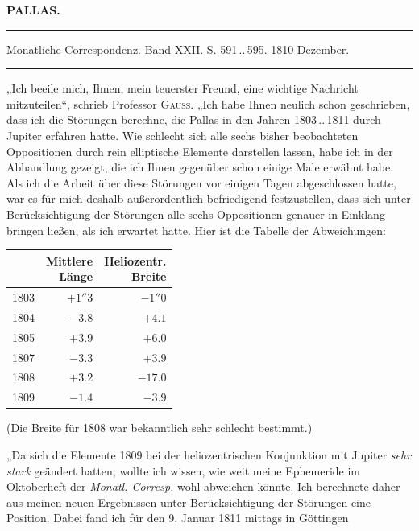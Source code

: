 \clearpage{}\hypertarget{native-325-lower}{}\label{native-325-lower}
\begin{center}\textbf{PALLAS.}\par\vspace{4pt}\hrule\vspace{4pt}\fontsize{10}{12}\selectfont Monatliche Correspondenz. Band XXII. S. 591\,..\,595. 1810 Dezember.\par\vspace{4pt}\hrule\vspace{4pt}\end{center}

\par\indent „Ich beeile mich, Ihnen, mein teuerster Freund, eine wichtige Nachricht mitzuteilen“, schrieb Professor \textsc{Gauss}. „Ich habe Ihnen neulich schon geschrieben, dass ich die Störungen berechne, die Pallas in den Jahren 1803\,..\,1811 durch Jupiter erfahren hatte. Wie schlecht sich alle sechs bisher beobachteten Oppositionen durch rein elliptische Elemente darstellen lassen, habe ich in der Abhandlung gezeigt, die ich Ihnen gegenüber schon einige Male erwähnt habe. Als ich die Arbeit über diese Störungen vor einigen Tagen abgeschlossen hatte, war es für mich deshalb außerordentlich befriedigend festzustellen, dass sich unter Berücksichtigung der Störungen alle sechs Oppositionen genauer in Einklang bringen ließen, als ich erwartet hatte. Hier ist die Tabelle der Abweichungen:

\begin{center}\fontsize{10}{12}\selectfont\setlength{\tabcolsep}{4pt}\renewcommand{\arraystretch}{1.15}\begin{tabular}{r|r|r}
 & \shortstack{Mittlere\\Länge} & \shortstack{Heliozentr.\\Breite}\\\hline
1803 & $+1''3$ & $-1''0$\\
1804 & $-3.8$ & $+4.1$\\
1805 & $+3.9$ & $+6.0$\\
1807 & $-3.3$ & $+3.9$\\
1808 & $+3.2$ & $-17.0$\\
1809 & $-1.4$ & $-3.9$\\
\end{tabular}\end{center}
\noindent (Die Breite für 1808 war bekanntlich sehr schlecht bestimmt.)

\par\indent „Da sich die Elemente 1809 bei der heliozentrischen Konjunktion mit Jupiter \emph{sehr stark} geändert hatten, wollte ich wissen, wie weit meine Ephemeride im Oktoberheft der \emph{Monatl. Corresp.} wohl abweichen könnte. Ich berechnete daher aus meinen neuen Ergebnissen unter Berücksichtigung der Störungen eine Position. Dabei fand ich für den 9. Januar 1811 mittags in Göttingen

